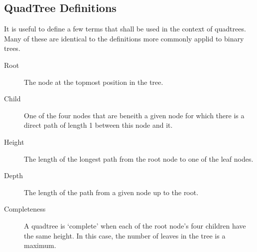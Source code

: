 \subsection{QuadTree Definitions}
\label{sub:quadtree_definitions}

It is useful to define a few terms that shall be used in the context of
quadtrees. Many of these are identical to the definitions more commonly applid
to binary trees.

\begin{description}
	\item[Root] The node at the topmost position in the tree.
	\item[Child] One of the four nodes that are beneith a given node for which
	there is a direct path of length 1 between this node and it.
	\item[Height] The length of the longest path from the root node to one of
	the leaf nodes.
	\item[Depth] The length of the path from a given node up to the root.
	\item[Completeness] A quadtree is `complete' when each of the root node's
	four children have the same height. In this case, the number of leaves in
	the tree is a maximum.
\end{description}
